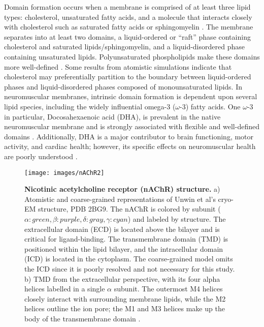 Domain formation occurs when a membrane is comprised of at least three lipid types: cholesterol, unsaturated fatty acids, and a molecule that interacts closely with cholesterol such as saturated fatty acids or sphingomyelin \citep{Feller_Acyl_2008,Yeagle2016115}.  The membrane separates into at least two domains, a liquid-ordered or ``raft'' phase containing cholesterol and saturated lipids/sphingomyelin, and a liquid-disordered phase containing unsaturated lipids. Polyunsaturated phospholipids make these domains more well-defined \citep{Levental_Polyunsaturated_2016}. Some results from atomistic simulations \citep{Sodt2014, Iyer2018} indicate that cholesterol may preferentially partition to the boundary between liquid-ordered phases and liquid-disordered phases composed of monounsaturated lipids.  In neuromuscular membranes, intrinsic domain formation is dependent upon several lipid species, including the widely influential omega-3 ($\omega$-3) fatty acids. One $\omega$-3 in particular, Docosahexaenoic acid (DHA), is prevalent in the native neuromuscular membrane and is strongly associated with flexible and well-defined domains  \citep{Turk2013,shaikh_dumaual_castillo_locascio_siddiqui_stillwell_wassall_2004}. Additionally, DHA is a major contributor to brain functioning, motor activity, and cardiac health; however, its specific effects on neuromuscular health are poorly understood \citep{12439486320170901,S000930840800032720080101,Georgieva2015}. 

\begin{figure}[htp]
\centering
\texttt{[image: images/nAChR2]}
\caption[Nicotinic acetylcholine receptor (nAChR) structure]{{\bf Nicotinic acetylcholine receptor (nAChR) structure.} a) Atomistic and coarse-grained representations of Unwin et al's cryo-EM structure, PDB 2BG9. The nAChR is colored by subunit ($\alpha:green,\beta:purple,\delta:gray,\gamma:cyan$) and labeled by structure. The extracellular domain (ECD) is located above the bilayer and is critical for ligand-binding. The transmembrane domain (TMD) is positioned within the lipid bilayer, and the intracellular domain (ICD) is located in the cytoplasm. The coarse-grained model omits the ICD since it is poorly resolved and not necessary for this study. b) TMD from the extracellular perspective, with its four alpha helices labelled in a single $\alpha$ subunit. The outermost M4 helices closely interact with surrounding membrane lipids, while the M2 helices outline the ion pore; the M1 and M3 helices make up the body of the transmembrane domain \citep{Unwin2005}.}
  \label{fig:structure}
\end{figure}



